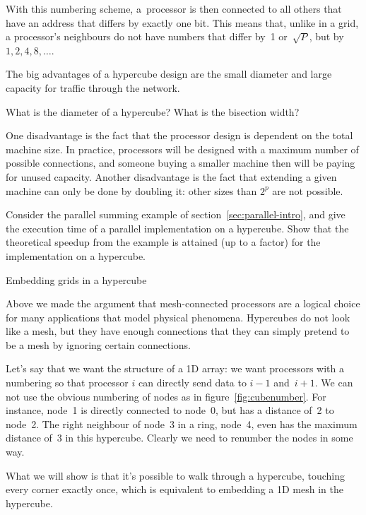 With this numbering scheme, a~processor is then connected to all others
that have an address that differs by exactly one bit. This means that,
unlike in a grid, a processor's neighbours do not have numbers
that differ by~1 or~$\sqrt P$, but by~$1,2,4,8,\ldots$.

The big advantages of a hypercube design are the small diameter and
large capacity for traffic through the network.
\begin{exercise}
  What is the diameter of a hypercube? What is the bisection width?
\end{exercise}

One disadvantage is the fact that the processor design is dependent on
the total machine size. In practice, processors will be designed with
a maximum number of possible connections, and someone buying a smaller
machine then will be paying for unused capacity.  Another
disadvantage is the fact that extending a given machine can only be
done by doubling it: other sizes than $2^p$ are not possible.

\begin{exercise}
  Consider the parallel summing example of
  section~\ref{sec:parallel-intro}, and give the execution time of a
  parallel implementation on a
  hypercube. Show that 
  the theoretical speedup from the example is attained (up to a
  factor) for the implementation on a hypercube.
\end{exercise}

 {Embedding grids in a hypercube}

Above we made the argument that mesh-connected processors are a
logical choice for many applications that model physical phenomena.
Hypercubes do not look like a mesh, but they have enough
connections that they can simply pretend to be a mesh by ignoring
certain connections. 

Let's say that we want the structure of a 1D array: we want processors
with a numbering so that processor $i$ can directly send data to $i-1$
and~$i+1$. We can not use the obvious numbering of
nodes as in figure~\ref{fig:cubenumber}. For instance, node~1 is
directly connected to node~0, but has a distance of~2 to node~2. The
right neighbour of node~3 in a ring, node~4, even has the maximum
distance of~3 in this hypercube. Clearly we need to renumber the nodes
in some way.

What we will show is that
it's possible to walk through a hypercube, touching
every corner exactly once, which is equivalent to embedding a 1D mesh
in the hypercube.

